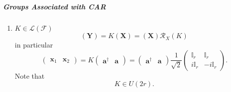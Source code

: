 \documentclass[aps,preprint]{revtex4}
\begin{document}
\subparagraph{Groups Associated with CAR}

\begin{enumerate}
\item $K\in \mathcal{L}\left( \mathcal{F}\right) $%
\begin{equation}
\left( \boldsymbol{Y}\right) =K\left( \boldsymbol{X}\right) =\left( 
\boldsymbol{X}\right) \mathcal{R}_{X}\left( K\right)
\end{equation}%
in particular 
\begin{equation}
\left( 
\begin{array}{cc}
\boldsymbol{x}_{1} & \boldsymbol{x}_{2}%
\end{array}%
\right) =K\left( 
\begin{array}{cc}
\boldsymbol{a}^{\dagger } & \boldsymbol{a}%
\end{array}%
\right) =\left( 
\begin{array}{cc}
\boldsymbol{a}^{\dagger } & \boldsymbol{a}%
\end{array}%
\right) \frac{1}{\sqrt{2}}\left( 
\begin{array}{cc}
\mathbb{I}_{r} & \mathbb{I}_{r} \\ 
i\mathbb{I}_{r} & -i\mathbb{I}_{r}%
\end{array}%
\right) .
\end{equation}%
Note that 
\begin{equation}
K\in U\left( 2r\right) .
\end{equation}


\end{enumerate}
\end{document}
